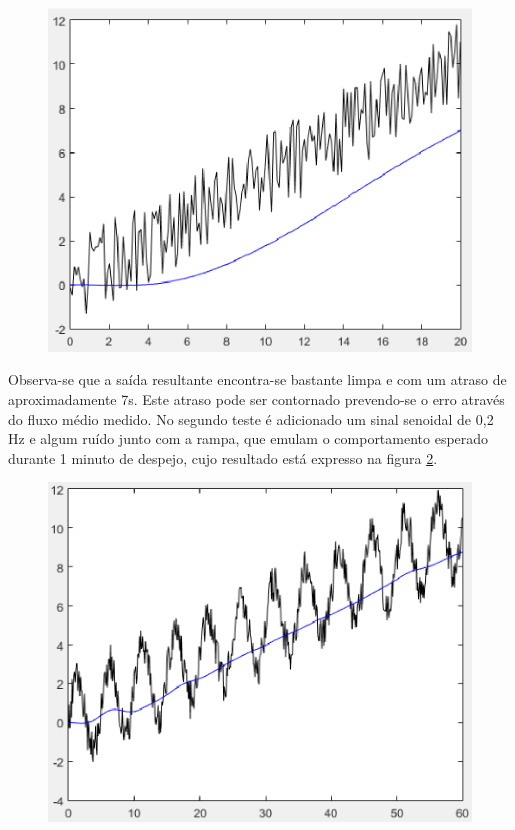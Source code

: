 \begin{figure}[h]
	\centering
	\includegraphics[keepaspectratio=true,scale=0.7]{figuras/ruido}
	\caption{}
	\label{ruido}
\end{figure}

Observa-se que a saída resultante encontra-se bastante limpa e com um atraso de aproximadamente 7s. Este atraso pode ser contornado prevendo-se o erro através do fluxo médio medido. No segundo teste é adicionado um sinal senoidal de 0,2 Hz e algum ruído junto com a rampa, que emulam o comportamento esperado durante 1 minuto de despejo, cujo resultado está expresso na figura \ref{osc}.

\begin{figure}[h]
	\centering
	\includegraphics[keepaspectratio=true,scale=0.7]{figuras/osc}
	\caption{}
	\label{osc}
\end{figure}

